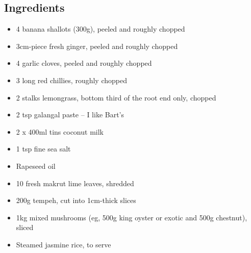 \documentclass{book}
\begin{document}
\subsection*{Ingredients}
\begin{itemize}
\item 4 banana shallots (300g), peeled and roughly chopped
\item 3cm-piece fresh ginger, peeled and roughly chopped
\item 4 garlic cloves, peeled and roughly chopped
\item 3 long red chillies, roughly chopped
\item 2 stalks lemongrass, bottom third of the root end only, chopped
\item 2 tsp galangal paste – I like Bart’s
\item 2 x 400ml tins coconut milk
\item 1 tsp fine sea salt
\item Rapeseed oil
\item 10 fresh makrut lime leaves, shredded
\item 200g tempeh, cut into 1cm-thick slices
\item 1kg mixed mushrooms (eg, 500g king oyster or exotic and 500g chestnut), sliced
\item Steamed jasmine rice, to serve
\end{itemize}
\end{document}
